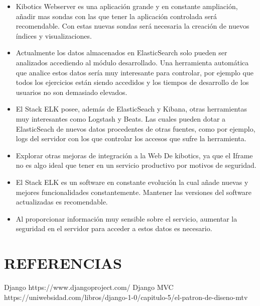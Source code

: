 \documentclass[11pt,a4paper]{book}
\begin{document}
			\begin{itemize}
				\item Kibotics Webserver es una aplicación grande y en constante ampliación, añadir mas sondas con las que tener la aplicación controlada será recomendable. Con estas nuevas sondas será necesaria la creación de nuevos índices y visualizaciones.\\
				
				\item Actualmente los datos almacenados en ElasticSearch solo pueden ser analizados accediendo al módulo desarrollado. Una herramienta automática que analice estos datos sería muy interesante para controlar, por ejemplo que todos los ejercicios están siendo accedidos y los tiempos de desarrollo de los usuarios no son demasiado elevados.\\
				
				\item El Stack ELK posee, además de ElasticSeach y Kibana, otras herramientas muy interesantes como Logstash y Beats. Las cuales pueden dotar a ElasticSeach de nuevos datos procedentes de otras fuentes, como por ejemplo, logs del servidor con los que controlar los accesos que sufre la herramienta.\\
				
				\item Explorar otras mejoras de integración a la Web De kibotics, ya que el Iframe no es algo ideal que tener en un servicio productivo por motivos de seguridad.\\
							
				\item El Stack ELK es un software en constante evolución la cual añade nuevas y mejores funcionalidades constantemente. Mantener las versiones del software actualizadas es recomendable.\\
				
				\item Al proporcionar información muy sensible sobre el servicio, aumentar la seguridad en el servidor para acceder a estos datos es necesario.\\
			\end{itemize}
		
	\chapter{REFERENCIAS}
	Django
https://www.djangoproject.com/
	Django MVC
https://uniwebsidad.com/libros/django-1-0/capitulo-5/el-patron-de-diseno-mtv
\end{document}
